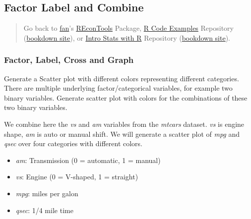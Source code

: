 \documentclass[
]{book}
\providecommand{\tightlist}{%
  \setlength{\itemsep}{0pt}\setlength{\parskip}{0pt}}
\begin{document}
\hypertarget{factor-label-and-combine}{%
\subsection{Factor Label and Combine}\label{factor-label-and-combine}}

\begin{quote}
Go back to \href{http://fanwangecon.github.io/}{fan}'s \href{https://fanwangecon.github.io/REconTools/}{REconTools} Package, \href{https://fanwangecon.github.io/R4Econ/}{R Code Examples} Repository (\href{https://fanwangecon.github.io/R4Econ/bookdown}{bookdown site}), or \href{https://fanwangecon.github.io/Stat4Econ/}{Intro Stats with R} Repository (\href{https://fanwangecon.github.io/Stat4Econ/bookdown}{bookdown site}).
\end{quote}

\hypertarget{factor-label-cross-and-graph}{%
\subsubsection{Factor, Label, Cross and Graph}\label{factor-label-cross-and-graph}}

Generate a Scatter plot with different colors representing different categories. There are multiple underlying factor/categorical variables, for example two binary variables. Generate scatter plot with colors for the combinations of these two binary variables.

We combine here the \emph{vs} and \emph{am} variables from the \emph{mtcars} dataset. \emph{vs} is engine shape, \emph{am} is auto or manual shift. We will generate a scatter plot of \emph{mpg} and \emph{qsec} over four categories with different colors.

\begin{itemize}
\tightlist
\item
  \emph{am}: Transmission (0 = automatic, 1 = manual)
\item
  \emph{vs}: Engine (0 = V-shaped, 1 = straight)
\item
  \emph{mpg}: miles per galon
\item
  \emph{qsec}: 1/4 mile time
\end{itemize}
\end{document}
